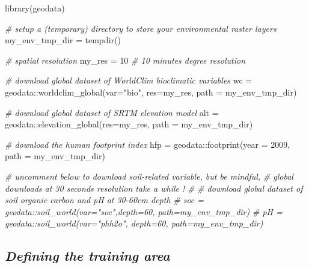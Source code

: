 \documentclass[
]{article}
\newenvironment{Shaded}{\begin{snugshade}}{\end{snugshade}}
\newcommand{\AttributeTok}[1]{\textcolor[rgb]{0.77,0.63,0.00}{#1}}
\newcommand{\CommentTok}[1]{\textcolor[rgb]{0.56,0.35,0.01}{\textit{#1}}}
\newcommand{\DecValTok}[1]{\textcolor[rgb]{0.00,0.00,0.81}{#1}}
\newcommand{\FunctionTok}[1]{\textcolor[rgb]{0.00,0.00,0.00}{#1}}
\newcommand{\NormalTok}[1]{#1}
\newcommand{\OtherTok}[1]{\textcolor[rgb]{0.56,0.35,0.01}{#1}}
\newcommand{\SpecialCharTok}[1]{\textcolor[rgb]{0.00,0.00,0.00}{#1}}
\newcommand{\StringTok}[1]{\textcolor[rgb]{0.31,0.60,0.02}{#1}}
\begin{document}
\begin{Shaded}
\begin{Highlighting}[]
\FunctionTok{library}\NormalTok{(geodata)}

\CommentTok{\# setup a (temporary) directory to store your environmental raster layers}
\NormalTok{my\_env\_tmp\_dir }\OtherTok{=} \FunctionTok{tempdir}\NormalTok{()}

\CommentTok{\# spatial resolution}
\NormalTok{my\_res }\OtherTok{=} \DecValTok{10} \CommentTok{\# 10 minutes degree resolution}

\CommentTok{\# download global dataset of WorldClim bioclimatic variables }
\NormalTok{wc }\OtherTok{=}\NormalTok{ geodata}\SpecialCharTok{::}\FunctionTok{worldclim\_global}\NormalTok{(}\AttributeTok{var=}\StringTok{"bio"}\NormalTok{,}
                               \AttributeTok{res=}\NormalTok{my\_res,}
                               \AttributeTok{path =}\NormalTok{ my\_env\_tmp\_dir)}

\CommentTok{\# download global dataset of SRTM elevation model}
\NormalTok{alt }\OtherTok{=}\NormalTok{ geodata}\SpecialCharTok{::}\FunctionTok{elevation\_global}\NormalTok{(}\AttributeTok{res=}\NormalTok{my\_res,}
                                \AttributeTok{path =}\NormalTok{ my\_env\_tmp\_dir)}

\CommentTok{\# download the human footprint index}
\NormalTok{hfp }\OtherTok{=}\NormalTok{ geodata}\SpecialCharTok{::}\FunctionTok{footprint}\NormalTok{(}\AttributeTok{year =} \DecValTok{2009}\NormalTok{,}
                   \AttributeTok{path =}\NormalTok{ my\_env\_tmp\_dir)}

\CommentTok{\# uncomment below to download soil{-}related variable, but be mindful,}
\CommentTok{\# global downloads at 30 seconds resolution take a while !}
\CommentTok{\#}
\CommentTok{\# download global dataset of soil organic carbon and pH at 30{-}60cm depth}
\CommentTok{\# soc = geodata::soil\_world(var="soc",depth=60, path=my\_env\_tmp\_dir)}
\CommentTok{\# pH = geodata::soil\_world(var="phh2o", depth=60, path=my\_env\_tmp\_dir)}
\end{Highlighting}
\end{Shaded}

\hypertarget{defining-the-training-area}{%
\subsection{\texorpdfstring{\emph{Defining the training
area}}{Defining the training area}}\label{defining-the-training-area}}
\end{document}
